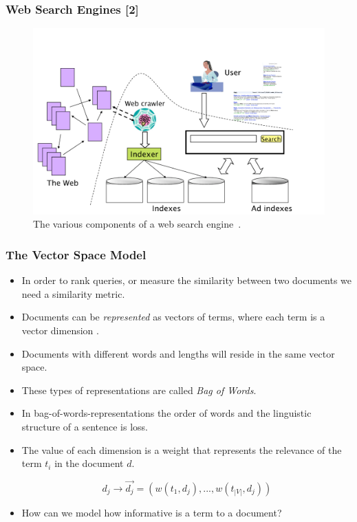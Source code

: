 \documentclass[handout]{beamer}
\begin{document}
\begin{frame}\frametitle{Web Search Engines [2]}

\begin{figure}[h!]
	\centering
	\includegraphics[scale=0.25]{pics/searchengine.png}
	\caption{ The various components of a web search engine~\cite{manning2008}.}
\end{figure}

\end{frame}

\begin{frame}\frametitle{The Vector Space Model}
\footnotesize{
\begin{itemize}
 \item In order to rank queries, or measure the similarity between two documents we need a similarity metric.
 \item Documents can be \textit{represented} as vectors of terms, where each term is a vector dimension \cite{salton1975vector}. 
 \item Documents with different words and lengths will reside in the same vector space.
 \item These types of representations are called \emph{Bag of Words}.
 \item In bag-of-words-representations the order of words and the linguistic structure of a sentence is loss. 
 \item The value of each dimension is a weight that represents the relevance of the term $t_{i}$ in the document $d$.

\begin{equation}
 d_{j} \rightarrow \overrightarrow{d_{j}}=(w(t_{1},d_{j}),...,w(t_{|V|},d_{j}))
\end{equation}

\item How can we model how informative is a term to a document?
 
\end{itemize}

}
 
\end{frame}
\end{document}
